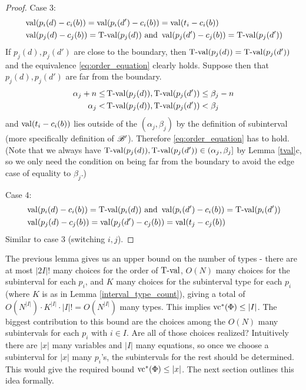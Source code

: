 \begin{proof}
 Case 3:
  \begin{align*}
    &\operatorname{val} (p_i(d) - c_i(b)) = \operatorname{val} (p_i(d') - c_i(b)) = \operatorname{val}(t_i - c_i(b)) \\
    &\operatorname{val} (p_j(d) - c_j(b)) = \operatorname{T-val}(p_j(d)) \text{ and } \operatorname{val} (p_j(d') - c_j(b)) = \operatorname{T-val}(p_j(d'))
  \end{align*}
  If $p_j(d), p_j(d')$ are close to the boundary,
  then $\operatorname{T-val}(p_j(d)) = \operatorname{T-val}(p_j(d'))$ and the equivalence \eqref{eq:order_equation} clearly holds.
  Suppose then that $p_j(d), p_j(d')$ are far from the boundary.
  \begin{align*}
    \alpha_j + n \leq &\operatorname{T-val}(p_j(d)), \operatorname{T-val}(p_j(d')) \leq \beta_j - n \\
    \alpha_j < &\operatorname{T-val}(p_j(d)), \operatorname{T-val}(p_j(d')) < \beta_j
  \end{align*}
  and $\operatorname{val}(t_i - c_i(b))$ lies outside of the $(\alpha_j, \beta_j)$
  by the definition of subinterval (more specifically definition of $\mathscr B'$).
  Therefore \eqref{eq:order_equation} has to hold.
  (Note that we always have $\operatorname{T-val}(p_j(d)), \operatorname{T-val}(p_j(d')) \in (\alpha_j, \beta_j]$ by Lemma \ref{tval}c, so 
  we only need the condition on being far from the boundary to avoid the edge case of equality to $\beta_j$.)

  Case 4:
  \begin{align*}
    &\operatorname{val} (p_i(d) - c_i(b)) = \operatorname{T-val}(p_i(d)) \text{ and } \operatorname{val} (p_i(d') - c_i(b)) = \operatorname{T-val}(p_i(d')) \\
    &\operatorname{val} (p_j(d) - c_j(b)) = \operatorname{val} (p_j(d') - c_j(b)) = \operatorname{val}(t_j - c_j(b))
  \end{align*}
  Similar to case 3 (switching $i,j$).
\end{proof}



  The previous lemma gives us an upper bound on the number of types - there are at most $|2I|!$ many choices for the order of $\operatorname{T-val}$,
  $O(N)$ many choices for the subinterval for each $p_i$,
  and $K$ many choices for the subinterval type for each $p_i$ (where $K$ is as in Lemma \ref{interval_type_count}),
  giving a total of $O(N^{|I|}) \cdot K^{|I|} \cdot |I|! = O(N^{|I|})$ many types.
  This implies $\operatorname{vc}^*(\Phi) \leq |I|$.
  The biggest contribution to this bound are the choices among the $O(N)$ many subintervals for each $p_i$ with $i \in I$.
  Are all of those choices realized?
  Intuitively there are $|x|$ many variables and $|I|$ many equations,
  so once we choose a subinterval for $|x|$ many $p_i$'s, the subintervals for the rest should be determined.
  This would give the required bound $\operatorname{vc}^*(\Phi) \leq |x|$.
  The next section outlines this idea formally.



